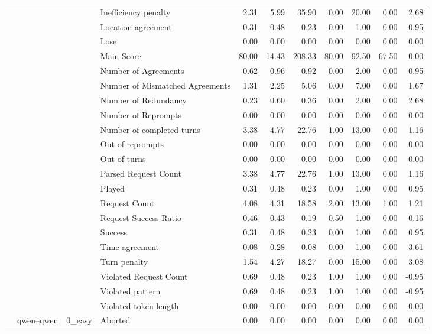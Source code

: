 \begin{tabular}{llllrrrrrrr}
 &  &  & Inefficiency penalty & 2.31 & 5.99 & 35.90 & 0.00 & 20.00 & 0.00 & 2.68 \\
 &  &  & Location agreement & 0.31 & 0.48 & 0.23 & 0.00 & 1.00 & 0.00 & 0.95 \\
 &  &  & Lose & 0.00 & 0.00 & 0.00 & 0.00 & 0.00 & 0.00 & 0.00 \\
 &  &  & Main Score & 80.00 & 14.43 & 208.33 & 80.00 & 92.50 & 67.50 & 0.00 \\
 &  &  & Number of Agreements & 0.62 & 0.96 & 0.92 & 0.00 & 2.00 & 0.00 & 0.95 \\
 &  &  & Number of Mismatched Agreements & 1.31 & 2.25 & 5.06 & 0.00 & 7.00 & 0.00 & 1.67 \\
 &  &  & Number of Redundancy & 0.23 & 0.60 & 0.36 & 0.00 & 2.00 & 0.00 & 2.68 \\
 &  &  & Number of Reprompts & 0.00 & 0.00 & 0.00 & 0.00 & 0.00 & 0.00 & 0.00 \\
 &  &  & Number of completed turns & 3.38 & 4.77 & 22.76 & 1.00 & 13.00 & 0.00 & 1.16 \\
 &  &  & Out of reprompts & 0.00 & 0.00 & 0.00 & 0.00 & 0.00 & 0.00 & 0.00 \\
 &  &  & Out of turns & 0.00 & 0.00 & 0.00 & 0.00 & 0.00 & 0.00 & 0.00 \\
 &  &  & Parsed Request Count & 3.38 & 4.77 & 22.76 & 1.00 & 13.00 & 0.00 & 1.16 \\
 &  &  & Played & 0.31 & 0.48 & 0.23 & 0.00 & 1.00 & 0.00 & 0.95 \\
 &  &  & Request Count & 4.08 & 4.31 & 18.58 & 2.00 & 13.00 & 1.00 & 1.21 \\
 &  &  & Request Success Ratio & 0.46 & 0.43 & 0.19 & 0.50 & 1.00 & 0.00 & 0.16 \\
 &  &  & Success & 0.31 & 0.48 & 0.23 & 0.00 & 1.00 & 0.00 & 0.95 \\
 &  &  & Time agreement & 0.08 & 0.28 & 0.08 & 0.00 & 1.00 & 0.00 & 3.61 \\
 &  &  & Turn penalty & 1.54 & 4.27 & 18.27 & 0.00 & 15.00 & 0.00 & 3.08 \\
 &  &  & Violated Request Count & 0.69 & 0.48 & 0.23 & 1.00 & 1.00 & 0.00 & -0.95 \\
 &  &  & Violated pattern & 0.69 & 0.48 & 0.23 & 1.00 & 1.00 & 0.00 & -0.95 \\
 &  &  & Violated token length & 0.00 & 0.00 & 0.00 & 0.00 & 0.00 & 0.00 & 0.00 \\
\cline{2-11} \cline{3-11}
 & \multirow[t]{378}{*}{qwen--qwen} & \multirow[t]{27}{*}{0_easy} & Aborted & 0.00 & 0.00 & 0.00 & 0.00 & 0.00 & 0.00 & 0.00 \\

\end{tabular}
